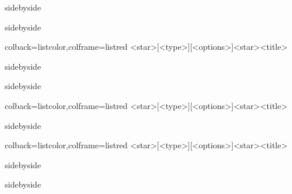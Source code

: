 \documentclass[fontset=none]{ctexart}
\begin{document}
	
	
	\begin{dispExample*}{sidebyside}
		
	\end{dispExample*}
	
	
	\begin{dispExample*}{sidebyside}
		
	\end{dispExample*}
	
	
	\begin{dispListing*}{colback=listcolor,colframe=listred}
		[<type>][<options>]<star>{<title>}
	\end{dispListing*}
	
	\begin{dispExample*}{sidebyside}
		
	\end{dispExample*}
	
	
	\begin{dispExample*}{sidebyside}
		
	\end{dispExample*}
	
	
	\begin{dispListing*}{colback=listcolor,colframe=listred}
		[<type>][<options>]<star>{<title>}
	\end{dispListing*}
	
	\begin{dispExample*}{sidebyside}
		
	\end{dispExample*}
	
	
	\begin{dispListing*}{colback=listcolor,colframe=listred}
		[<type>][<options>]<star>{<title>}
	\end{dispListing*}
	
	\begin{dispExample*}{sidebyside}
		
	\end{dispExample*}
	
	
	\begin{dispExample*}{sidebyside}
		
	\end{dispExample*}
	
\end{document}
